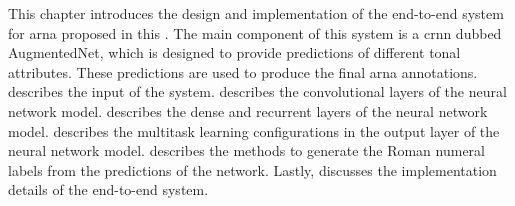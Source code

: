 

This chapter introduces the design and implementation of the
end-to-end system for \gls{arna} proposed in this
\thesisdiss{}. The main component of this system is a
\gls{crnn} dubbed \gls{AugmentedNet}, which is designed to
provide predictions of different tonal attributes. These
predictions are used to produce the final \gls{arna}
annotations.  describes the input of the
system.  describes the
convolutional layers of the neural network model.
 describes the dense and
recurrent layers of the neural network model.
 describes the multitask
learning configurations in the output layer of the neural
network model.
 describes
the methods to generate the Roman numeral labels from the
predictions of the network. Lastly, 
discusses the implementation details of the end-to-end
system.

